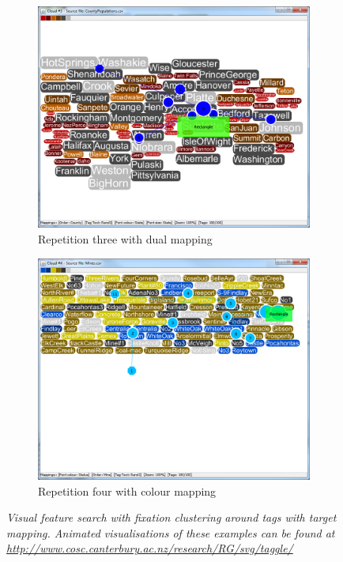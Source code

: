 \begin{figure}[!htb]
\begin{subfigure}{.5\textwidth}
  \centering
  \includegraphics[scale=0.25]{t3featuresearch.png}
  \caption{Repetition three with dual mapping}
\end{subfigure}%
\begin{subfigure}{.5\textwidth}
  \centering
  \includegraphics[scale=0.25]{t4featuresearch.png}
  \caption{Repetition four with colour mapping}
\end{subfigure}
\caption{\textit{Visual feature search with fixation clustering around tags with target mapping. Animated visualisations of these examples can be found at \url{http://www.cosc.canterbury.ac.nz/research/RG/svg/taggle/}}}
\label{fig:featuresearch}
\end{figure}

